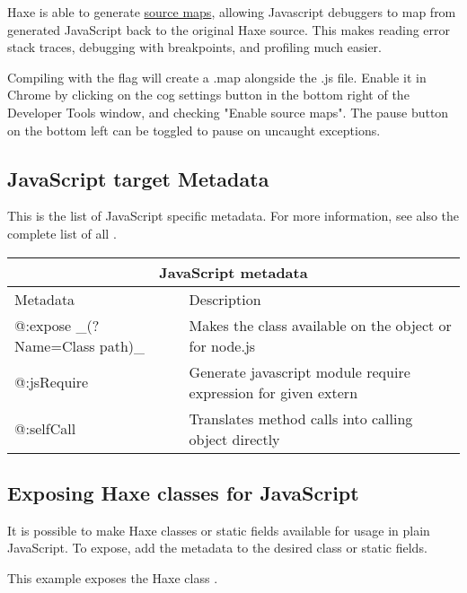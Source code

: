 Haxe is able to generate \href{http://www.html5rocks.com/en/tutorials/developertools/sourcemaps/}{source maps}, allowing Javascript debuggers to map from generated JavaScript back to the original Haxe source. This makes reading error stack traces, debugging with breakpoints, and profiling much easier.

Compiling with the  flag will create a .map alongside the .js file. Enable it in Chrome by clicking on the cog settings button in the bottom right of the Developer Tools window, and checking "Enable source maps". The pause button on the bottom left can be toggled to pause on uncaught exceptions.

\subsection{JavaScript target Metadata}
\label{target-javascript-metadata}

This is the list of JavaScript specific metadata. For more information, see also the complete list of all .

\begin{center}
\begin{tabular}{| l | l |}
	\hline
	\multicolumn{2}{|c|}{JavaScript metadata} \\ \hline
	Metadata &  Description \\ \hline
	@:expose \_(?Name=Class path)\_  &  Makes the class available on the \expr{window} object or \expr{exports} for node.js  \\
	@:jsRequire  &  Generate javascript module require expression for given extern \\
	@:selfCall  &  Translates method calls into calling object directly \\
\end{tabular}
\end{center}

\subsection{Exposing Haxe classes for JavaScript}
\label{target-javascript-expose}

It is possible to make Haxe classes or static fields available for usage in plain JavaScript. 
To expose, add the  metadata to the desired class or static fields.

This example exposes the Haxe class .

